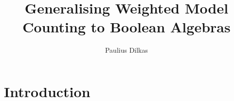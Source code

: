 \documentclass{article}
\title{Generalising Weighted Model Counting to Boolean Algebras}
\author{Paulius Dilkas}
\theoremstyle{definition}
\theoremstyle{remark}
\begin{document}
\maketitle

\section{Introduction}



\end{document}
